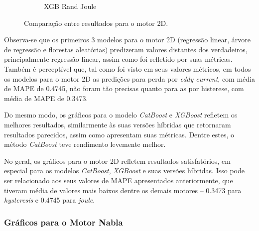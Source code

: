 \documentclass{article}
\begin{document}
\begin{figure}[!htbp]
\begin{subfigure}[b]{0.23\textwidth}
        \caption{XGB Rand Joule}
    \end{subfigure}
    \hfill
    \begin{subfigure}[b]{0.23\textwidth}
        \centering
        \null
    \end{subfigure}
    
    \caption{Comparação entre resultados para o motor 2D.}
\end{figure}

\newpage

Observa-se que os primeiros 3 modelos para o motor 2D (regressão linear, árvore de regressão e florestas aleatórias) predizeram valores distantes dos verdadeiros, principalmente regressão linear, assim como foi refletido por suas métricas. Também é perceptível que, tal como foi visto em seus valores métricos, em todos os modelos para o motor 2D as predições para perda por \textit{eddy current}, com média de MAPE de 0.4745, não foram tão precisas quanto para as por histerese, com média de MAPE de 0.3473.

Do mesmo modo, os gráficos para o modelo \textit{CatBoost} e \textit{XGBoost} refletem os melhores resultados, similarmente às suas versões híbridas que retornaram resultados parecidos, assim como apresentam suas métricas. Dentre estes, o método \textit{CatBoost} teve rendimento levemente melhor.

No geral, os gráficos para o motor 2D refletem resultados satisfatórios, em especial para os modelos \textit{CatBoost}, \textit{XGBoost} e suas versões híbridas. Isso pode ser relacionado aos seus valores de MAPE apresentados anteriormente, que tiveram média de valores mais baixos dentre os demais motores \--- 0.3473 para \textit{hysteresis} e 0.4745 para \textit{joule}.

\newpage

\subsubsection{Gráficos para o Motor Nabla}
\end{document}
